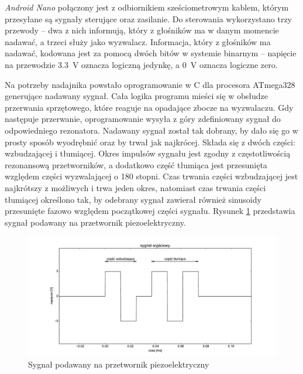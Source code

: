 

\textit{Android Nano} połączony jest z odbiornikiem sześciometrowym kablem, którym przesyłane są sygnały sterujące oraz zasilanie.
Do sterowania wykorzystano trzy przewody -- dwa z nich informują, który z głośników ma w danym momencie nadawać,
a trzeci służy jako wyzwalacz. 
Informacja, który z głośników  ma nadawać, kodowana jest za pomocą dwóch bitów w systemie binarnym --
napięcie na przewodzie \SI{3,3}{V} oznacza logiczną jedynkę, a \SI{0}{V} oznacza logiczne zero.

Na potrzeby nadajnika powstało oprogramowanie w C dla procesora ATmega328 generujące nadawany sygnał.
Cała logika programu mieści się w obsłudze przerwania sprzętowego, które reaguje na opadające zbocze na wyzwalaczu.
Gdy następuje przerwanie, oprogramowanie wysyła z góry zdefiniowany sygnał do odpowiedniego rezonatora. 
Nadawany sygnał został tak dobrany, by dało się go w prosty sposób wyodrębnić oraz by trwał jak najkrócej. Składa się z dwóch
części: wzbudzającej i tłumiącej.
Okres impulsów sygnału jest zgodny z częstotliwością rezonansową przetworników, a dodatkowo część tłumiąca
jest przesunięta względem części wyzwalającej o 180 stopni.
Czas trwania części wzbudzającej jest najkrótszy z możliwych i trwa jeden okres, natomiast czas trwania części tłumiącej określono
tak, by odebrany sygnał zawierał również sinusoidy przesunięte fazowo względem początkowej części sygnału.
Rysunek \ref{fig:output_signal} przedstawia sygnał podawany na przetwornik piezoelektryczny.

\begin{figure}[ht]
    \centering
    \includegraphics[width=1.0\textwidth, trim= 25mm 0mm 0mm 0mm,clip]{output_signal}
    \caption{Sygnał podawany na przetwornik piezoelektryczny}
    \label{fig:output_signal}
\end{figure}

